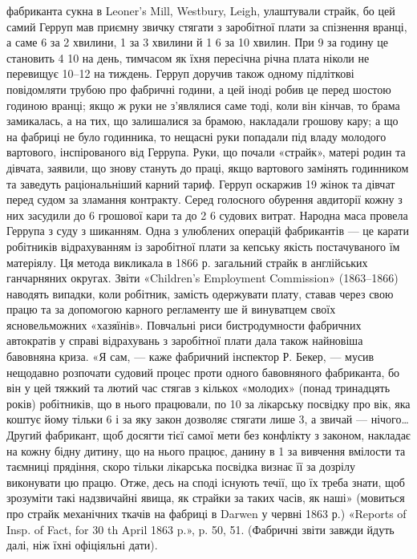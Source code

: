 {фабриканта сукна в Leoner’s Mill, Westbury, Leigh, улаштували страйк,
бо цей самий Герруп мав приємну звичку стягати з заробітної плати за
спізнення вранці, а саме 6 за 2 хвилини, 1 за 3 хвилини й
1 6 за 10 хвилин. При 9 за годину це становить
4 10 на день, тимчасом як їхня пересічна річна
плата ніколи не перевищує 10--12 на тиждень. Герруп доручив
також одному підліткові повідомляти трубою про фабричні години,
а цей іноді робив це перед шостою годиною вранці; якщо ж руки не з’являлися
саме тоді, коли він кінчав, то брама замикалась, а на тих, що залишалися
за брамою, накладали грошову кару; а що на фабриці не було
годинника, то нещасні руки попадали під владу молодого вартового,
інспірованого від Геррупа. Руки, що почали «страйк», матері родин
та дівчата, заявили, що знову стануть до праці, якщо вартового замінять
годинником та заведуть раціональніший карний тариф. Герруп
оскаржив 19 жінок та дівчат перед судом за зламання контракту. Серед
голосного обурення авдиторії кожну з них засудили до 6 грошової
кари та до 2 6 судових витрат. Народна маса провела
Геррупа з суду з шиканням. Одна з улюблених операцій фабрикантів
— це карати робітників відрахуванням із заробітної плати за
кепську якість постачуваного їм матеріялу. Ця метода викликала в 1866 р.
загальний страйк в англійських ганчарняних округах. Звіти «Children’s
Employment Commission» (1863--1866) наводять випадки, коли робітник,
замість одержувати плату, ставав через свою працю та за допомогою
карного регламенту ше й винуватцем своїх ясновельможних «хазяїнів».
Повчальні риси бистродумности фабричних автократів у справі відрахувань
з заробітної плати дала також найновіша бавовняна криза.
«Я сам, — каже фабричний інспектор Р. Бекер, — мусив нещодавно розпочати
судовий процес проти одного бавовняного фабриканта, бо він у цей тяжкий
та лютий час стягав з кількох «молодих» (понад тринадцять років)
робітників, що в нього працювали, по 10 за лікарську посвідку
про вік, яка коштує йому тільки 6 і за яку закон дозволяє стягати
лише 3, а звичай — нічого\dots{} Другий фабрикант, щоб досягти
тієї самої мети без конфлікту з законом, накладає на кожну бідну дитину,
що на нього працює, данину в 1 за вивчення вмілости та
таємниці прядіння, скоро тільки лікарська посвідка визнає її за дозрілу
виконувати цю працю. Отже, десь на споді існують течії, що їх треба знати,
щоб зрозуміти такі надзвичайні явища, як страйки за таких часів, як
наші» (мовиться про страйк механічних ткачів на фабриці в Darwen у
червні 1863 р.) «Reports of Insp. of Fact, for 30 th April 1863 p.», p. 50,
51. (Фабричні звіти завжди йдуть далі, ніж їхні офіціяльні дати).
}

